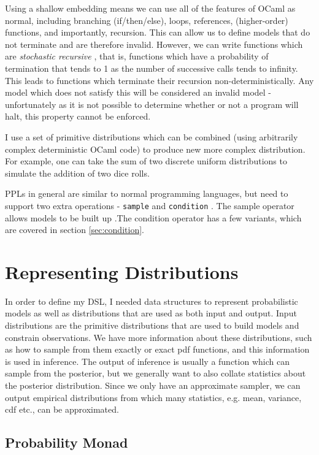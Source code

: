 Using a shallow embedding means we can use all of the features of OCaml as normal, including branching (if/then/else), loops, references, (higher-order) functions, and importantly, recursion. This can allow us to define models that do not terminate and are therefore invalid. However, we can write functions which are \textit{stochastic recursive} \cite{siegmund}, that is, functions which have a probability of termination that tends to 1 as the number of successive calls tends to infinity. This leads to functions which terminate their recursion non-deterministically. Any model which does not satisfy this will be considered an invalid model - unfortunately as it is not possible to determine whether or not a program will halt, this property cannot be enforced. 

I use a set of primitive distributions which can be combined (using arbitrarily complex deterministic OCaml code) to produce new more complex distribution. For example, one can take the sum of two discrete uniform distributions to simulate the addition of two dice rolls. 

PPLs in general are similar to normal programming languages, but need to support two extra operations - \texttt{sample} and \texttt{condition} \cite{idkwhattocitehere}. The sample operator allows models to be built up .The condition operator has a few variants, which are covered in section \ref{sec:condition}.

\section{Representing Distributions}
In order to define my DSL, I needed data structures to represent probabilistic models as well as distributions that are used as both input and output. Input distributions are the primitive distributions that are used to build models and constrain observations. We have more information about these distributions, such as how to sample from them exactly or exact pdf functions, and this information is used in inference. The output of inference is usually a function which can sample from the posterior, but we generally want to also collate statistics about the posterior distribution. Since we only have an approximate sampler, we can output empirical distributions from which many statistics, e.g. mean, variance, cdf etc.,  can be approximated.

\subsection{Probability Monad}

